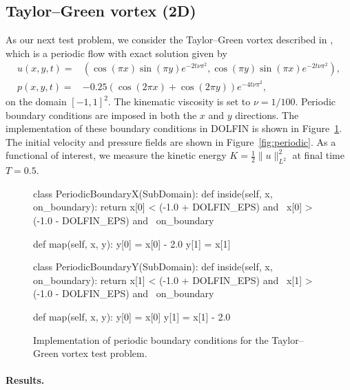 \subsection{Taylor--Green vortex (2D)}

As our next test problem, we consider the Taylor--Green vortex
described in \citet{CanutoHussainiQuarteroniEtAl2007}, which is a
periodic flow with exact solution given by
\begin{equation}\label{eq:periodic}
  \begin{split}
    u(x,y,t) = & (\cos (\pi x) \sin (\pi y)  e^{-2t\nu\pi^2}, \cos (\pi y)  \sin (\pi x)  e^{-2t\nu\pi^2}), \\
    p(x,y,t) = & -0.25(\cos(2\pi x ) + \cos(2\pi y ))  e^{-4t\nu\pi^2},
  \end{split}
\end{equation}
on the domain $[-1, 1]^{2}$. The kinematic viscosity is set to $\nu =
1/100$. Periodic boundary conditions are imposed in both the $x$ and
$y$ directions. The implementation of these boundary conditions in
DOLFIN is shown in Figure~\ref{fig:periodic_bcs}. The initial velocity
and pressure fields are shown in Figure~\ref{fig:periodic}. As a
functional of interest, we measure the kinetic energy $K = \frac{1}{2}
\|u\|^2_{L^2}$ at final time $T = 0.5$.

\begin{figure}
\bwfig
    \begin{python}
class PeriodicBoundaryX(SubDomain):
    def inside(self, x, on_boundary):
        return x[0] < (-1.0 + DOLFIN_EPS) and \
               x[0] > (-1.0 - DOLFIN_EPS) and \
               on_boundary

    def map(self, x, y):
        y[0] = x[0] - 2.0
        y[1] = x[1]

class PeriodicBoundaryY(SubDomain):
    def inside(self, x, on_boundary):
        return x[1] < (-1.0 + DOLFIN_EPS) and \
               x[1] > (-1.0 - DOLFIN_EPS) and \
               on_boundary

    def map(self, x, y):
        y[0] = x[0]
        y[1] = x[1] - 2.0
    \end{python}
    \caption{Implementation of periodic boundary conditions for the
      Taylor--Green vortex test problem.}
    \label{fig:periodic_bcs}
\end{figure}

\paragraph{Results.}

